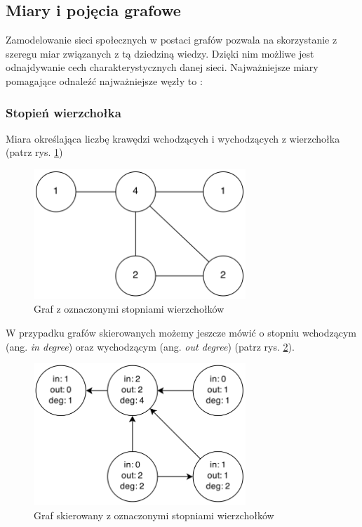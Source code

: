 \subsection{Miary i pojęcia grafowe}
Zamodelowanie sieci społecznych w postaci grafów pozwala na skorzystanie z szeregu
miar związanych z tą dziedziną wiedzy. Dzięki nim możliwe jest odnajdywanie cech
charakterystycznych danej sieci. Najważniejsze miary pomagające odnaleźć najważniejsze
węzły to \cite{estrada}: 


\subsubsection{Stopień wierzchołka}
Miara określająca liczbę krawędzi wchodzących i 
  wychodzących z wierzchołka (patrz rys. \ref{image:stopien-wierzcholka})
  
\begin{figure}[ht!]
\centering
\includegraphics[width=80mm]{img/stopien-wierzcholka.png}
\caption{Graf z oznaczonymi stopniami wierzchołków}
\label{image:stopien-wierzcholka}
\end{figure}

W przypadku grafów skierowanych możemy jeszcze mówić o stopniu wchodzącym 
(ang. \textit{in degree}) oraz wychodzącym (ang. \textit{out degree}) 
(patrz rys. \ref{image:stopien-wierzcholka-skierowany}).
  
\clearpage
\begin{figure}[ht!]
\centering
\includegraphics[width=80mm]{img/stopien-wierzcholka-skierowany.png}
\caption{Graf skierowany z oznaczonymi stopniami wierzchołków}
\label{image:stopien-wierzcholka-skierowany}
\end{figure}
  
